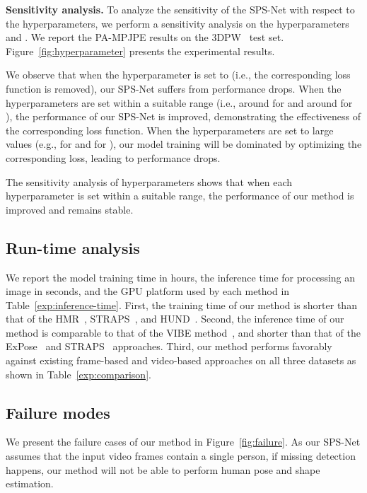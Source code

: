 \documentclass[times,referee,twocolumn,final,authoryear]{elsarticle}
\newcommand{\revised}[1]{{{#1}}}
\newcommand{\heading}[1]{\noindent\textbf{#1}}
\begin{document}
\heading{Sensitivity analysis.}
To analyze the sensitivity of the SPS-Net with respect to the hyperparameters, we perform a sensitivity analysis on the hyperparameters  and .
We report the PA-MPJPE results on the 3DPW~\citep{3DPW} test set.
Figure~\ref{fig:hyperparameter} presents the experimental results.

We observe that when the hyperparameter is set to  (i.e., the corresponding loss function is removed), our SPS-Net suffers from performance drops.
When the hyperparameters are set within a suitable range (i.e., around  for  and around  for ), the performance of our SPS-Net is improved, demonstrating the effectiveness of the corresponding loss function.
When the hyperparameters are set to large values (e.g.,  for  and  for ), our model training will be dominated by optimizing the corresponding loss, leading to performance drops.

The sensitivity analysis of hyperparameters shows that when each hyperparameter is set within a suitable range, the performance of our method is improved and remains stable.
\revised{
\vspace{-3.0mm}
\subsection{Run-time analysis}
We report the model training time in hours, the inference time for processing an image in seconds, and the GPU platform used by each method in Table~\ref{exp:inference-time}. 
First, the training time of our method is shorter than that of the HMR~\citep{HMR}, STRAPS~\citep{sengupta2020synthetic}, and HUND~\citep{zanfir2020neural}.
Second, the inference time of our method is comparable to that of the VIBE method~\citep{VIBE}, and shorter than that of the  ExPose~\citep{ExPose} and STRAPS~\citep{sengupta2020synthetic} approaches.
Third, our method performs favorably against existing frame-based and video-based approaches on all three datasets as shown in Table~\ref{exp:comparison}.
}

\vspace{-3.0mm}
\subsection{Failure modes}

We present the failure cases of our method in Figure~\ref{fig:failure}.
As our SPS-Net assumes that the input video frames contain a single person, if missing detection happens, our method will not be able to perform human pose and shape estimation.
\end{document}
